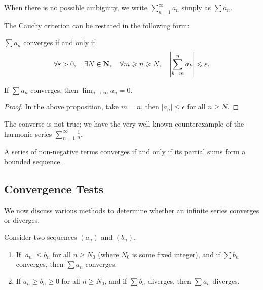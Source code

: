 \begin{notation}
When there is no possible ambiguity, we write $\displaystyle\sum_{n=1}^{\infty}a_n$ simply as $\sum a_n$.
\end{notation}

The Cauchy criterion can be restated in the following form:

\begin{proposition}
$\sum a_n$ converges if and only if
\[\forall\varepsilon>0,\quad\exists N\in\mathbf N,\quad\forall m\geqslant n\geqslant N,\quad\left|\sum_{k=m}^n a_k\right|\leqslant\varepsilon.\]
\end{proposition}

\begin{corollary}
If $\sum a_n$ converges, then $\displaystyle\lim_{n\to\infty}a_n=0$.
\end{corollary}

\begin{proof}
In the above proposition, take $m=n$, then $|a_n|\le\epsilon$ for all $n\ge N$.
\end{proof}

\begin{remark}
The converse is not true; we have the very well known counterexample of the harmonic series $\displaystyle\sum_{n=1}^\infty\frac{1}{n}$.
\end{remark}

\begin{proposition}
A series of non-negative terms converges if and only if its partial sums form a bounded sequence.
\end{proposition}

\subsection{Convergence Tests}
We now discuss various methods to determine whether an infinite series converges or diverges.

\begin{lemma}
Consider two sequences $(a_n)$ and $(b_n)$.
\begin{enumerate}[label=(\arabic*)]
\item If $|a_n|\le b_n$ for all $n\ge N_0$ (where $N_0$ is some fixed integer), and if $\sum b_n$ converges, then $\sum a_n$ converges.
\item If $a_n\ge b_n\ge0$ for all $n\ge N_0$, and if $\sum b_n$ diverges, then $\sum a_n$ diverges.
\end{enumerate}
\end{lemma}

